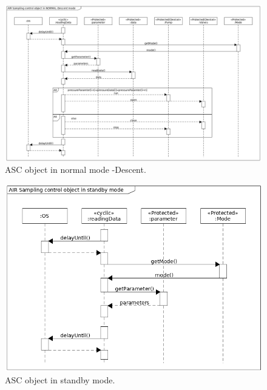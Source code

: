 \begin{landscape}
\begin{figure}[H]
    \centering
    \includegraphics[height=0.9\textwidth]{appendix/img/ASC-seq-dia-v1-2-b.png}
    \caption{ASC object in normal mode -Descent.}
    \label{ASCb}
\end{figure}
\begin{figure}[H]
    \centering
    \includegraphics[height=0.9\textwidth]{appendix/img/ASC-seq-dia-v1-2-c.png}
    \caption{ASC object in standby mode.}
    \label{ASCb}
\end{figure}

\end{landscape}
